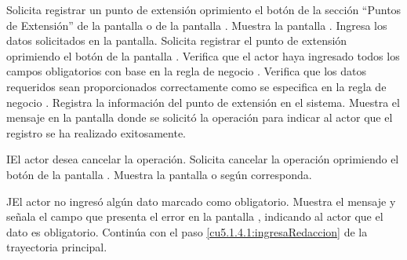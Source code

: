 
 \begin{UCtrayectoria}
	\UCpaso[\UCactor] Solicita registrar un punto de extensión oprimiento el botón \btnAgregar de la sección ``Puntos de Extensión'' de la pantalla  o de la pantalla . 
	\UCpaso[\UCsist] Muestra la pantalla . 
	\UCpaso[\UCactor] Ingresa los datos solicitados en la pantalla. \label{cu5.1.4.1:ingresaRedaccion}
	\UCpaso[\UCactor] Solicita registrar el punto de extensión oprimiendo el botón  de la pantalla .  
	\UCpaso[\UCsist] Verifica que el actor haya ingresado todos los campos obligatorios con base en la regla de negocio . 
	\UCpaso[\UCsist] Verifica que los datos requeridos sean proporcionados correctamente como se especifica en la regla de negocio .  
	\UCpaso[\UCsist] Registra la información del punto de extensión en el sistema.
	\UCpaso[\UCsist] Muestra el mensaje  en la pantalla donde se solicitó la operación
	para indicar al actor que el registro se ha realizado exitosamente. 
\end{UCtrayectoria}

    

 \begin{UCtrayectoriaA}{I}{El actor desea cancelar la operación.}
    \UCpaso[\UCactor] Solicita cancelar la operación oprimiendo el botón  de la pantalla .
    \UCpaso[\UCsist] Muestra la pantalla  o  según corresponda.
 \end{UCtrayectoriaA}
 
 \begin{UCtrayectoriaA}{J}{El actor no ingresó algún dato marcado como obligatorio.}
    \UCpaso[\UCsist] Muestra el mensaje  y señala el campo que presenta el error en la pantalla , indicando al actor que el dato es obligatorio.
    \UCpaso[] Continúa con el paso \ref{cu5.1.4.1:ingresaRedaccion} de la trayectoria principal.
 \end{UCtrayectoriaA}
 
